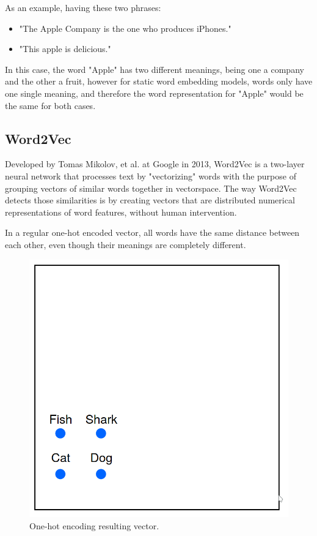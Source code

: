     \par As an example, having these two phrases:

    \begin{itemize}
        \item "The Apple Company is the one who produces iPhones."
        \item "This apple is delicious."
    \end{itemize}

    \par In this case, the word "Apple" has two different meanings, being one a company and the other a fruit, however for static word embedding models, words only have one single meaning, and therefore  the word representation for "Apple" would be the same for both cases. \cite{Batista2018}

   
        \subsection{Word2Vec}

        \par Developed by Tomas Mikolov, et al. at Google in 2013, Word2Vec is a two-layer neural network that processes text by "vectorizing" words with the purpose of grouping vectors of similar words together in vectorspace. The way Word2Vec detects those similarities is by creating vectors that are distributed numerical representations of word features, without human intervention.


        \par In a regular one-hot encoded vector, all words have the same distance between each other, even though their meanings are completely different.

        \begin{figure}[htb]
            \centering
            \includegraphics[scale = 0.1]{Sections/3StateOfTheArt/3_images/one_hot_ex.png}
            \caption{One-hot encoding resulting vector. \cite{word2vec_explained}} 
        \end{figure}


